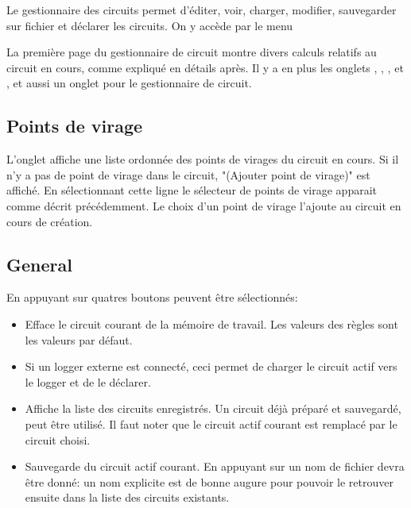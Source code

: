 Le gestionnaire des circuits permet d'éditer, voir, charger, modifier, sauvegarder sur fichier et déclarer les circuits. On y accède par le menu
\begin{quote}
\blink{}
\end{quote} 

La première page du gestionnaire de circuit montre divers calculs relatifs au circuit en cours, comme expliqué en détails après. Il y a en plus les onglets   , , , et  , et aussi un onglet pour  le gestionnaire de circuit.

\subsection*{Points de virage}
L'onglet  affiche une liste ordonnée des points de virages du circuit en cours. Si il n'y a pas de point de virage dans le circuit,  "(Ajouter point de virage)" est affiché. En sélectionnant cette ligne le sélecteur de points de virage apparait comme décrit précédemment. Le choix d'un point de virage l'ajoute au circuit en cours de création.

\subsection*{General}
En appuyant sur  quatres boutons peuvent être sélectionnés:

\begin{itemize}
\item {} Efface le circuit courant de la mémoire de travail. Les valeurs des règles sont les valeurs par défaut.
\item {}  Si un logger externe est connecté, ceci permet de charger le circuit actif vers le logger et de le déclarer.
\item {} Affiche la liste des circuits enregistrés. Un circuit déjà préparé et sauvegardé, peut être utilisé. Il faut noter que le circuit actif courant est remplacé par le circuit choisi.
\item {}  Sauvegarde du circuit actif courant. En appuyant sur  un nom de fichier devra être donné: un nom explicite est de bonne augure pour pouvoir le retrouver ensuite dans la liste des circuits existants.
\end{itemize}

